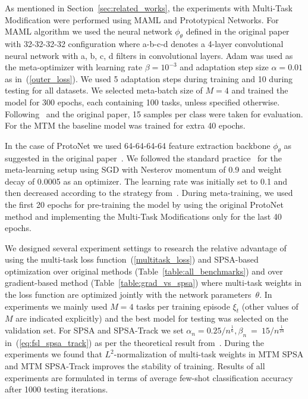 \documentclass{article}
\begin{document}
As mentioned in Section~\ref{sec:related_works}, the experiments with Multi-Task Modification were performed using MAML and Prototypical Networks. For MAML algorithm we used the neural network $\phi_{\theta}$ defined in the original paper~\cite{finn2017model} with 32-32-32-32 configuration where a-b-c-d denotes a 4-layer convolutional neural network with a, b, c, d filters in convolutional layers. Adam was used as the meta-optimizer with learning rate $\beta = 10^{-3}$ and adaptation step size $\alpha = 0.01$ as in~(\ref{outer_loss}). We used 5 adaptation steps during training and 10 during testing for all datasets. We selected meta-batch size of $M = 4$ and trained the model for 300 epochs, each containing 100 tasks, unless specified otherwise. Following~\cite{Ravi2017OptimizationAA} and the original paper, 15 samples per class were taken for evaluation. For the MTM the baseline model was trained for extra 40 epochs.

In the case of ProtoNet we used 64-64-64-64 feature extraction backbone $\phi_{\theta}$ as suggested in the original paper~\cite{NIPS2017_cb8da676}. We followed the standard practice~\cite{gidaris2018dynamic} for the meta-learning setup using SGD with Nesterov momentum of 0.9 and weight decay of 0.0005 as an optimizer. The learning rate was initially set to 0.1 and then decreased according to the strategy from~\cite{gidaris2018dynamic}. During meta-training, we used the first 20 epochs for pre-training the model by using the original ProtoNet method and implementing the Multi-Task Modifications only for the last 40 epochs. 

We designed several experiment settings to research the relative advantage of using the multi-task loss function~(\ref{multitask_loss}) and SPSA-based optimization over original methods (Table~\ref{table:all_benchmarks}) and over gradient-based method (Table~\ref{table:grad_vs_spsa}) where multi-task weights in the loss function are optimized jointly with the network parameters~$\theta$. In experiments we mainly used $M = 4$ tasks per training episode $\xi_t$ (other values of $M$ are indicated explicitly) and the best model for testing was selected on the validation set. For SPSA and SPSA-Track we set $\alpha_n=0.25 / n^{\frac{1}{6}}, \beta_n~=~15 / n^{\frac{1}{24}}$ in~(\ref{eq:fsl_spsa_track}) as per the theoretical result from~\cite{granichin2015randomized}. During the experiments we found that $L^2$-normalization of multi-task weights in MTM SPSA and MTM SPSA-Track improves the stability of training. Results of all experiments are formulated in terms of average few-shot classification accuracy after 1000 testing iterations.
\end{document}
